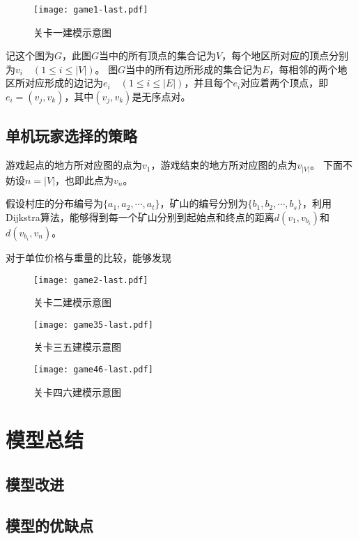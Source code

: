 \documentclass{cumcmthesis}
\begin{document}
\begin{figure}[!h]
	\centering
	\texttt{[image: game1-last.pdf]}
	\caption{关卡一建模示意图}
\end{figure}
记这个图为$G$，此图$G$当中的所有顶点的集合记为$V$，每个地区所对应的顶点分别为$v_i\quad (1\leq i\leq |V|)$。
图$G$当中的所有边所形成的集合记为$E$，每相邻的两个地区所对应形成的边记为$e_i\quad (1\leq i\leq |E|)$，并且每个$e_i$对应着两个顶点，即$e_i=(v_j,v_k)$，其中$(v_j,v_k)$是无序点对。\par

\subsection{单机玩家选择的策略}
游戏起点的地方所对应图的点为$v_1$，游戏结束的地方所对应图的点为$v_{|V|}$。
下面不妨设$n=|V|$，也即此点为$v_n$。\par

假设村庄的分布编号为$\{a_1,a_2,\cdots,a_t\}$，矿山的编号分别为$\{b_1,b_2,\cdots,b_s\}$，利用Dijkstra算法，能够得到每一个矿山分别到起始点和终点的距离$d(v_1,v_{b_i})$和$d(v_{b_i},v_n)$。\par 

对于单位价格与重量的比较，能够发现

\begin{figure}[!h]
	\centering
	\texttt{[image: game2-last.pdf]}
	\caption{关卡二建模示意图}
\end{figure}

\begin{figure}[!h]
	\centering
	\texttt{[image: game35-last.pdf]}
	\caption{关卡三五建模示意图}
\end{figure}

\begin{figure}[!h]
	\centering
	\texttt{[image: game46-last.pdf]}
	\caption{关卡四六建模示意图}
\end{figure}

\newpage
\section{模型总结}
\subsection{模型改进}

\subsection{模型的优缺点}
\end{document}
